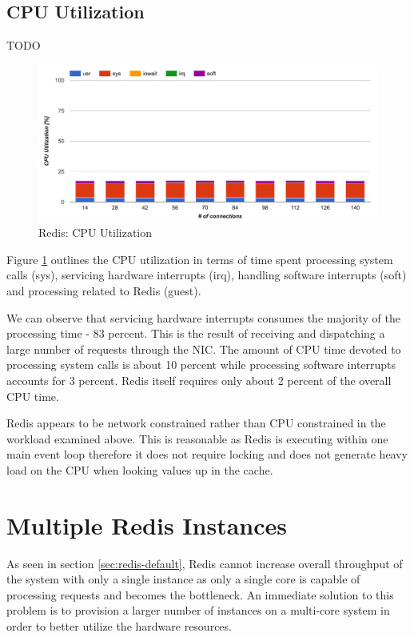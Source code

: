 \subsection{CPU Utilization}

TODO
\begin{figure}[h]
    \includegraphics[width=\textwidth]{./res2/r_baseline_cpu.png}
    \caption{Redis: CPU Utilization}
    \label{fig:redis-default-cpu}
\end{figure}

Figure \ref{fig:redis-default-cpu} outlines the CPU utilization in terms of time spent processing system calls (sys), servicing hardware interrupts (irq), handling software interrupts (soft) and processing related to Redis (guest).

We can observe that servicing hardware interrupts consumes the majority of the processing time - 83 percent. This is the result of receiving and dispatching a large number of requests through the NIC. The amount of CPU time devoted to processing system calls is about 10 percent while processing software interrupts accounts for 3 percent. Redis itself requires only about 2 percent of the overall CPU time.

Redis appears to be network constrained rather than CPU constrained in the workload examined above. This is reasonable as Redis is executing within one main event loop therefore it does not require locking and does not generate heavy load on the CPU when looking values up in the cache.


\section{Multiple Redis Instances}
\label{sec:multiple-redis-instances}

As seen in section \ref{sec:redis-default}, Redis cannot increase overall throughput of the system with only a single instance as only a single core is capable of processing requests and becomes the bottleneck. An immediate solution to this problem is to provision a larger number of instances on a multi-core system in order to better utilize the hardware resources.

